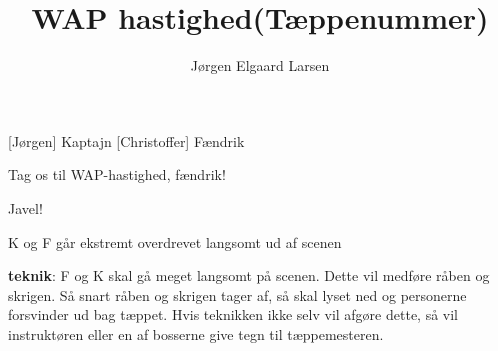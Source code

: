 \documentclass[a4paper,11pt]{article}
\title{WAP hastighed(Tæppenummer)}
\author{Jørgen Elgaard Larsen}
\begin{document}
\maketitle

\begin{roles}
[Jørgen] Kaptajn
[Christoffer] Fændrik
\end{roles}

\begin{sketch}

 Tag os til WAP-hastighed, fændrik!

 Javel!

\scene K og F går ekstremt overdrevet langsomt ud af scenen

\scene \textbf{teknik}: F og K skal gå meget langsomt på scenen. Dette
vil medføre råben og skrigen. Så snart råben og skrigen tager af, så
skal lyset ned og personerne forsvinder ud bag tæppet. Hvis teknikken
ikke selv vil afgøre dette, så vil instruktøren eller en af bosserne
give tegn til tæppemesteren.

\end{sketch}
\end{document}
